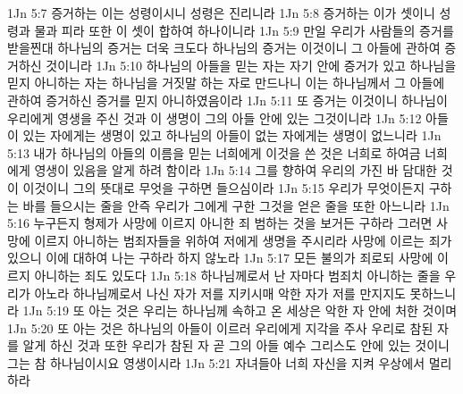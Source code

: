 1Jn 5:7  증거하는 이는 성령이시니 성령은 진리니라
1Jn 5:8  증거하는 이가 셋이니 성령과 물과 피라 또한 이 셋이 합하여 하나이니라
1Jn 5:9  만일 우리가 사람들의 증거를 받을찐대 하나님의 증거는 더욱 크도다 하나님의 증거는 이것이니 그 아들에 관하여 증거하신 것이니라
1Jn 5:10  하나님의 아들을 믿는 자는 자기 안에 증거가 있고 하나님을 믿지 아니하는 자는 하나님을 거짓말 하는 자로 만드나니 이는 하나님께서 그 아들에 관하여 증거하신 증거를 믿지 아니하였음이라
1Jn 5:11  또 증거는 이것이니 하나님이 우리에게 영생을 주신 것과 이 생명이 그의 아들 안에 있는 그것이니라
1Jn 5:12  아들이 있는 자에게는 생명이 있고 하나님의 아들이 없는 자에게는 생명이 없느니라
1Jn 5:13  내가 하나님의 아들의 이름을 믿는 너희에게 이것을 쓴 것은 너희로 하여금 너희에게 영생이 있음을 알게 하려 함이라
1Jn 5:14  그를 향하여 우리의 가진 바 담대한 것이 이것이니 그의 뜻대로 무엇을 구하면 들으심이라
1Jn 5:15  우리가 무엇이든지 구하는 바를 들으시는 줄을 안즉 우리가 그에게 구한 그것을 얻은 줄을 또한 아느니라
1Jn 5:16  누구든지 형제가 사망에 이르지 아니한 죄 범하는 것을 보거든 구하라 그러면 사망에 이르지 아니하는 범죄자들을 위하여 저에게 생명을 주시리라 사망에 이르는 죄가 있으니 이에 대하여 나는 구하라 하지 않노라
1Jn 5:17  모든 불의가 죄로되 사망에 이르지 아니하는 죄도 있도다
1Jn 5:18  하나님께로서 난 자마다 범죄치 아니하는 줄을 우리가 아노라 하나님께로서 나신 자가 저를 지키시매 악한 자가 저를 만지지도 못하느니라
1Jn 5:19  또 아는 것은 우리는 하나님께 속하고 온 세상은 악한 자 안에 처한 것이며
1Jn 5:20  또 아는 것은 하나님의 아들이 이르러 우리에게 지각을 주사 우리로 참된 자를 알게 하신 것과 또한 우리가 참된 자 곧 그의 아들 예수 그리스도 안에 있는 것이니 그는 참 하나님이시요 영생이시라
1Jn 5:21  자녀들아 너희 자신을 지켜 우상에서 멀리하라


